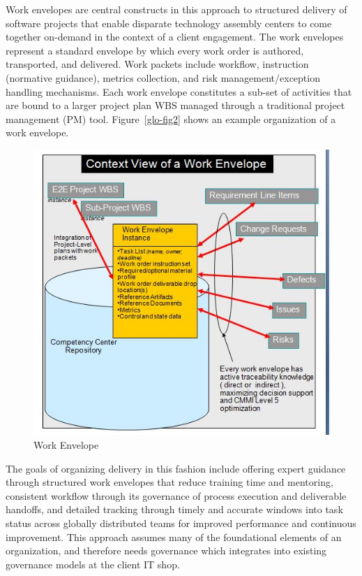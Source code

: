 Work envelopes are central constructs in this approach to structured delivery of software projects that enable disparate technology assembly centers to come together on-demand in the context of a client engagement.  The work envelopes represent a standard envelope by which every work order is authored, transported, and delivered. Work packets include workflow, instruction (normative guidance), metrics collection, and risk management/exception handling mechanisms. Each work envelope constitutes a sub-set of activities that are bound to a larger project plan WBS managed through a traditional project management (PM) tool. Figure~\ref{glo-fig2} shows an example organization of a work envelope.

\begin{figure}[h]
\includegraphics[scale=0.2]{figs/glowenv.jpg}
\caption{Work Envelope}
\label{glofig2}
\end{figure}

The goals of organizing delivery in this fashion include offering expert guidance through structured work envelopes that reduce training time and mentoring, consistent workflow through its governance of process execution and deliverable handoffs, and detailed tracking through timely and accurate windows into task status across globally distributed teams for improved performance and continuous improvement. This approach assumes many of the foundational elements of an organization, and therefore needs governance which integrates into existing governance models at the client IT shop.

